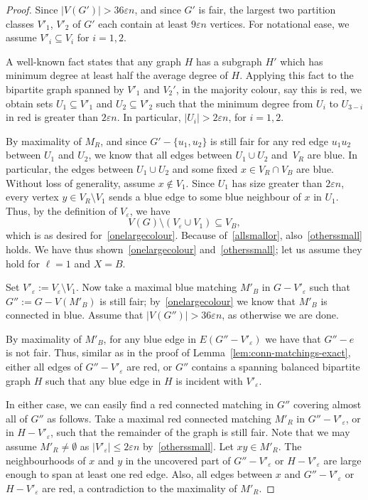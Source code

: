 \documentclass[a4paper,10pt]{article}
\let\eps\varepsilon
\begin{document}
\begin{proof}
Since $|V(G')|>36\eps n$, and since $G'$ is fair, the largest two partition classes $V'_1$, $V'_2$ of $G'$  each contain at least $9\eps n$ vertices. For notational ease, we assume $V'_i\subseteq V_i$ for $i=1,2$.

A well-known fact states that any graph $H$ has a subgraph $H'$ which has minimum degree at least half the average degree of $H$. Applying this fact to the bipartite graph spanned by $V'_1$ and $V_2'$, in the majority colour, say this is red, we obtain sets $U_1\subseteq V'_1$ and $U_2\subseteq V'_2$ such that the minimum degree from $U_i$ to $U_{3-i}$ in red  is greater than $2\eps n$. In particular, $|U_i|> 2\eps n$, for $i=1,2$.

By maximality of $M_R$, and since $G'-\{u_1,u_2\}$ is still fair for any red edge $u_1u_2$ between $U_1$ and $U_2$, we know that all edges between $U_1\cup U_2$ and~$V_R$ are blue. In particular, the edges between $U_1\cup U_2$ and some fixed $x\in V_R\cap V_B$ are blue. Without loss of generality, assume $x\notin V_1$. Since $U_1$ has size greater than $2\varepsilon n$, every vertex $y\in V_R\setminus V_1$ sends a blue edge to some blue neighbour of $x$ in $U_1$. Thus, by the definition of $V_\eps$, we have
\begin{equation*}
V(G)\setminus (V_\eps\cup V_1)\subseteq V_B,
\end{equation*}
which is as desired for~\eqref{onelargecolour}. Because of~\eqref{allsmallor}, also~\eqref{otherssmall} holds. We have thus shown~\eqref{onelargecolour} and~\eqref{otherssmall}; let us assume they hold for $\ell =1$ and $X=B$.

\medskip

Set $V'_\eps:=V_\eps\setminus V_1$.
Now take a maximal blue matching $M'_B$ in $G-V'_\eps$ such that $G'':=G-V(M'_B)$ is still fair; by~\eqref{onelargecolour} we know that $M'_B$ is connected in blue. Assume that $|V(G'')| >36\eps n$, as otherwise we are done. 

By maximality of $M'_B$, for any blue edge in $E(G''-V'_\eps)$ we have that $G''-e$ is not fair. Thus, similar as in the proof of Lemma~\ref{lem:conn-matchings-exact},  either all edges of $G''-V'_\eps$ are red, or $G''$ contains a  spanning balanced bipartite graph $H$ such that any blue edge in $H$ is incident with $V'_\eps$. 

In either case, we can easily find a red connected matching in $G''$ covering almost all of $G''$ as follows. Take a maximal red connected matching $M'_R$ in $G''-V'_\eps$, or in  $H-V'_\eps$, such that the remainder of the graph is still fair. Note that we may assume $M'_R\neq\emptyset$ as $|V'_\eps|\leq 2\eps n$ by~\eqref{otherssmall}.
 Let $xy\in M'_R$. The neighbourhoods of $x$ and $y$ in the uncovered part of $G''-V'_\eps$ or $H-V'_\eps$ are large enough to span at least one red edge. Also, all edges between $x$ and $G''-V'_\eps$ or $H-V'_\eps$ are red, a contradiction to the maximality of $M'_R$.
\end{proof}
\end{document}
